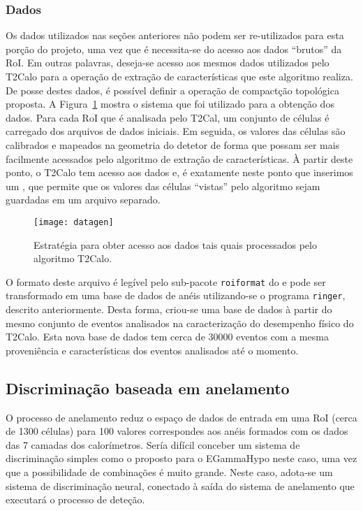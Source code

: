 \subsubsection{Dados}

Os dados utilizados nas seções anteriores não podem ser re-utilizados para
esta porção do projeto, uma vez que é necessita-se do acesso aos dados
``brutos'' da RoI. Em outras palavras, deseja-se acesso aos mesmos dados
utilizados pelo T2Calo para a operação de extração de características que este
algoritmo realiza. De posse destes dados, é possível definir a operação de
compactção topológica proposta. A Figura~\ref{fig:datagen} mostra o sistema
que foi utilizado para a obtenção dos dados. Para cada RoI que é analisada
pelo T2Cal, um conjunto de células é carregado dos arquivos de dados
iniciais. Em seguida, os valores das células são calibrados e mapeados na
geometria do detetor de forma que possam ser mais facilmente acessados pelo
algoritmo de extração de características. À partir deste ponto, o T2Calo tem
acesso aos dados e, é exatamente neste ponto que inserimos um , que
permite que os valores das células ``vistas'' pelo algoritmo sejam guardadas
em um arquivo separado.

\begin{figure}
\begin{center}
\texttt{[image: datagen]}
\end{center}
\caption{Estratégia para obter acesso aos dados tais quais processados pelo
algoritmo T2Calo.}
\label{fig:datagen}
\end{figure}

O formato deste arquivo é legível pelo sub-pacote \texttt{roiformat} do
 e pode ser transformado em uma base de dados de anéis
utilizando-se o programa \texttt{ringer}, descrito anteriormente. Desta forma,
criou-se uma base de dados à partir do mesmo conjunto de eventos analisados na
caracterização do desempenho físico do T2Calo. Esta nova base de dados tem
cerca de $30000$ eventos com a mesma proveniência e características dos
eventos analisados até o momento.

\subsection{Discriminação baseada em anelamento}

O processo de anelamento reduz o espaço de dados de entrada em uma RoI (cerca de
1300 células) para 100 valores correspondes aos anéis formados com os dados
das 7 camadas dos calorímetros. Sería difícil conceber um sistema de
discriminação simples como o proposto para o EGammaHypo neste caso, uma vez
que a possibilidade de combinações é muito grande. Neste caso, adota-se um
sistema de discriminação neural, conectado à saída do sistema de anelamento que
executará o processo de deteção.

